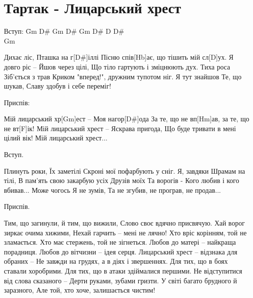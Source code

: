 \section{Тартак - Лицарський хрест}
\begin{guitar}
\begin{flushleft}
\begin{tabbing}
Вступ: \=Gm D\# Gm D\# Gm D\# D D\# \\
       \>Gm\\
\end{tabbing}

Дихає ліс,
Пташка на г[D#]іллі
Пісню спів[Hb]ає, що тішить мій сл[D]ух.
Я довго ріс – 
Йшов через цілі,
Що тіло гартують і зміцнюють дух.
Тиха роса
Зіб'ється з трав
Криком "вперед!", дружним тупотом ніг.
Я тут знайшов
Те, що шукав,
Славу здобув і себе переміг!

Приспів:

Мій лицарський хр[Gm]ест – 
Моя нагор[D#]ода
За те, що не вп[Hm]ав, за те, що не вт[F]ік!
Мій лицарський хрест – 
Яскрава пригода,
Що буде тривати в мені цілий вік!
Мій лицарський хрест...

Вступ.

Плинуть роки,
Їх заметілі
Скроні мої пофарбують у сніг.
Я, завдяки
Шрамам на тілі,
В пам'ять свою закарбую усіх
Друзів моїх 
Та ворогів -
Кого любив і кого вбивав...
Може чогось
Я не зумів,
Та не згубив, не програв, не продав...

Приспів.

Тим, що загинули, й тим, що вижили,
Слово своє вдячно присвячую.
Хай ворог зиркає очима хижими,
Нехай гарчить – мені не лячно!
Хто вріс корінням, той не зламається.
Хто має стержень, той не зігнеться.
Любов до матері – найкраща порадниця.
Любов до вітчизни – ідея серця.
Лицарський хрест – відзнака для обраних – 
Не завжди на грудях, а в діях і звершеннях.
Для тих, що в боях ставали хоробрими.
Для тих, що в атаки здіймалися першими.
Не відступитися від слова сказаного – 
Дерти руками, зубами гризти.
У світі багато брудного й заразного,
Але той, хто хоче, залишається чистим!
\end{flushleft}

\end{guitar}